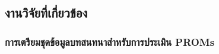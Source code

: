 



\subsection{งานวิจัยที่เกี่ยวข้อง}

\subsubsection{การเตรียมชุดข้อมูลบทสนทนาสำหรับการประเมิน PROMs}
\label{sec:review-dataset}


